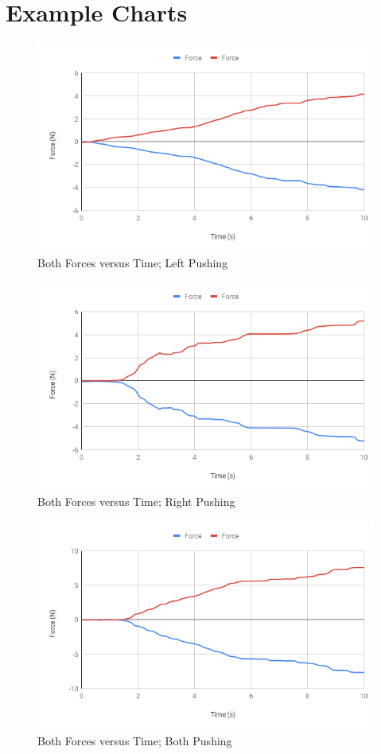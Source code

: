 \section{Example Charts}
%
\begin{figure}[ht]
    \centering
    \includegraphics[scale=0.71]{image/05-third-law/Run-13-Both.png}
    \caption{Both Forces versus Time; Left Pushing}
    \label{figure:05.ff.L}
\end{figure}
%
\begin{figure}[ht]
    \centering
    \includegraphics[scale=0.71]{image/05-third-law/Run-14-Both.png}
    \caption{Both Forces versus Time; Right Pushing}
    \label{figure:05.ff.R}
\end{figure}
%
\begin{figure}[ht]
    \centering
    \includegraphics[scale=0.71]{image/05-third-law/Run-15-Both.png}
    \caption{Both Forces versus Time; Both Pushing}
    \label{figure:05.ff.B}
\end{figure}
